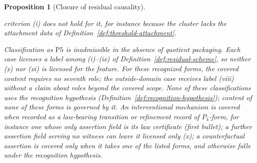 \documentclass[11pt]{article}
\newtheorem{proposition}[theorem]{Proposition}
\theoremstyle{definition}
\newcommand{\Pfive}{\ensuremath{\mathrm{P5}}}
\begin{document}
\begin{proposition}[Closure of residual causality]
\begin{itemize}[topsep=2pt,itemsep=1pt]
    criterion (i) does not hold for it, for instance because the cluster lacks
    the attachment data of Definition~\ref{def:threshold-attachment}.
\end{itemize}
Classification as \Pfive{} is inadmissible in the absence of quotient
packaging. Each case licenses a label among (i)--(ix) of
Definition~\ref{def:residual-scheme}, so neither (x) nor (xi) is licensed for
the feature. For these recognized forms, the covered content requires no
seventh role; the outside-domain case receives label (viii) without a claim
about roles beyond the covered scope. None of these classifications uses the
recognition hypothesis (Definition~\ref{def:recognition-hypothesis}); content
of none of these forms is governed by it. An interventional mechanism is covered
when recorded as a law-bearing transition or refinement record of \(P_4\)-form, for instance one whose only assertion field is its law certificate (first bullet); a further assertion field serving no witness can leave it licensed only (x); a
counterfactual assertion is covered only when it takes one of the listed forms,
and otherwise falls under the recognition hypothesis.
\end{proposition}
\end{document}

